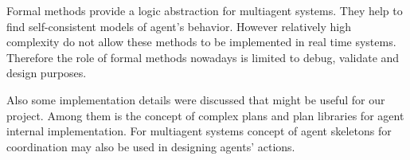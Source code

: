 Formal methods provide a logic abstraction for multiagent systems. They help to find self-consistent models of agent's behavior. However relatively high
complexity do not allow these methods to be implemented in real time systems. Therefore the role of formal methods nowadays is limited to debug, validate and design purposes. 

Also some implementation details were discussed that might be useful for our project. Among them is the concept of complex plans and plan libraries for agent internal implementation. For multiagent systems concept of agent skeletons for coordination may also be used in designing agents' actions.